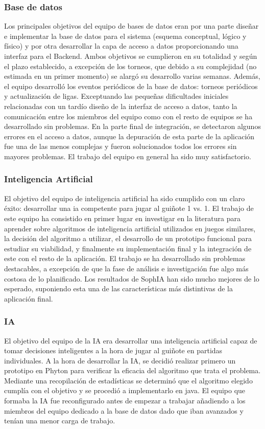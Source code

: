 \subsubsection*{Base de datos}
Los principales objetivos del equipo de bases de datos eran por una parte diseñar e implementar la base de datos para el sistema (esquema conceptual, lógico y físico) y por otra desarrollar la capa de acceso a datos proporcionando una interfaz para el Backend. Ambos objetivos se cumplieron en su totalidad y según el plazo establecido, a excepción de los torneos, que debido a su complejidad (no estimada en un primer momento) se alargó su desarrollo varias semanas. Además, el equipo desarrolló los eventos periódicos de la base de datos: torneos periódicos y actualización de ligas. Exceptuando las pequeñas dificultades iniciales relacionadas con un tardío diseño de la interfaz de acceso a datos, tanto la comunicación entre los miembros del equipo como con el resto de equipos se ha desarrollado sin problemas. En la parte final de integración, se detectaron algunos errores en el acceso a datos, aunque la depuración de esta parte de la aplicación fue una de las menos complejas y fueron solucionados todos los errores sin mayores problemas. El trabajo del equipo en general ha sido muy satisfactorio. 

\subsubsection*{Inteligencia Artificial}
El objetivo del equipo de inteligencia artificial ha sido cumplido con un claro éxito: desarrollar una ia competente para jugar al guiñote 1 vs. 1. El trabajo de este equipo ha consistido en primer lugar en investigar en la literatura para aprender sobre algoritmos de inteligencia artificial utilizados en juegos similares, la decisión del algoritmo a utilizar, el desarrollo de un prototipo funcional para estudiar su viabilidad, y finalmente su implementación final y la integración de este con el resto de la aplicación. El trabajo se ha desarrollado sin problemas destacables, a excepción de que la fase de análisis e investigación fue algo más costosa de lo planificado. Los resultados de SophIA han sido mucho mejores de lo esperado, suponiendo esta una de las características más distintivas de la aplicación final.

\subsubsection*{IA}
El objetivo del equipo de la IA era desarrollar una inteligencia artificial capaz de tomar decisiones inteligentes a la hora de jugar al guiñote en partidas individuales. A la hora de desarrollar la IA, se decidió realizar primero un prototipo en Phyton para verificar la eficacia del algoritmo que trata el problema. Mediante una recopilación de estadísticas se determinó que el algoritmo elegido cumplía con el objetivo y se procedió a implementarlo en java.
El equipo que formaba la IA fue reconfigurado antes de empezar a trabajar añadiendo a los miembros del equipo dedicado a la base de datos dado que iban avanzados y tenían una menor carga de trabajo.

